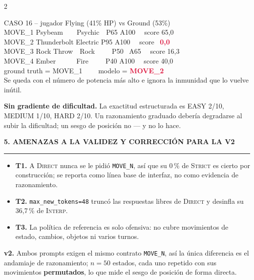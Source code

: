 \documentclass[9pt,a4paper]{extarticle}
\newcommand{\heading}[1]{%
  \par\vspace{1.1mm}\noindent
  {\color{navy}\bfseries\small\MakeUppercase{#1}}
  \par\vspace{0.7mm}\noindent
  {\color{amber}\rule{\linewidth}{1.1pt}}
  \par\vspace{0.6mm}\noindent\ignorespaces}
\begin{document}
\begin{multicols}{2}
\vspace{-0.5mm}
\begin{quietbox}
{\footnotesize\ttfamily
CASO 16 -- jugador Flying (41\% HP) vs Ground (53\%)\\[0.4mm]
MOVE\_1 Psybeam\ \ \ \ Psychic\ \ P65 A100 \ \ score 65,0\\
MOVE\_2 Thunderbolt Electric P95 A100 \ \ score \ \textcolor{crimson}{\textbf{0,0}}\\
MOVE\_3 Rock Throw\ \ Rock\ \ \ \ \ P50 \ A65 \ \ score 16,3\\
MOVE\_4 Ember\ \ \ \ \ \ Fire\ \ \ \ \ P40 A100 \ \ score 40,0\\[0.6mm]
ground truth = MOVE\_1 \ \ \ \ modelo = \textcolor{crimson}{\textbf{MOVE\_2}}}\\[0.6mm]
{\footnotesize Se queda con el n\'umero de potencia m\'as alto e ignora la inmunidad que lo vuelve in\'util.}
\end{quietbox}

\textbf{Sin gradiente de dificultad.} La exactitud estructurada es EASY 2/10, MEDIUM 1/10, HARD 2/10. Un razonamiento graduado deber\'ia degradarse al subir la dificultad; un sesgo de posici\'on no --- y no lo hace.

\heading{5. Amenazas a la validez y correcci\'on para la v2}
\begin{itemize}
\item \textbf{T1.} A \textsc{Direct} nunca se le pidi\'o \texttt{MOVE\_N}, as\'i que su $0\,\%$ de \textsc{Strict} es cierto por construcci\'on; se reporta como l\'inea base de interfaz, no como evidencia de razonamiento.
\item \textbf{T2.} \texttt{max\_new\_tokens=48} trunc\'o las respuestas libres de \textsc{Direct} y desinfla su 36,7\,\% de \textsc{Interp}.
\item \textbf{T3.} La pol\'itica de referencia es solo ofensiva: no cubre movimientos de estado, cambios, objetos ni varios turnos.
\end{itemize}
\textbf{v2.} Ambos prompts exigen el mismo contrato \texttt{MOVE\_N}, as\'i la \'unica diferencia es el andamiaje de razonamiento; $n=50$ estados, cada uno repetido con sus movimientos \textbf{permutados}, lo que mide el sesgo de posici\'on de forma directa.


\end{multicols}
\end{document}
